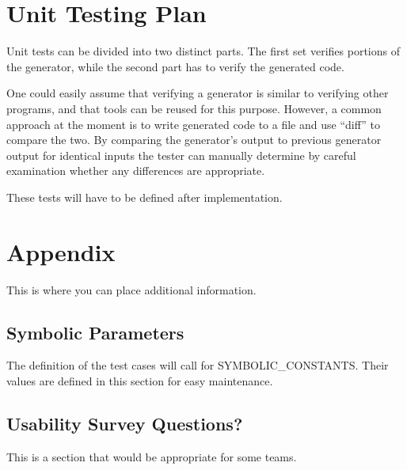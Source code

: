 \documentclass[12pt, titlepage]{article}
\begin{document}
				
\section{Unit Testing Plan}
		
Unit tests can be divided into two distinct parts. The first set verifies 
portions of the generator, while the second part has to verify the generated 
code.

One could easily assume that verifying a generator is similar to verifying 
other programs, and that tools can be reused for this purpose. However, a 
common approach at the moment is to write generated code to a file and use 
``diff'' to compare the two.
By comparing the generator's output to previous generator output for identical 
inputs the tester can manually determine by careful examination whether any 
differences are appropriate.

These tests will have to be defined after implementation.







\newpage

\section{Appendix}

This is where you can place additional information.

\subsection{Symbolic Parameters}

The definition of the test cases will call for SYMBOLIC\_CONSTANTS.
Their values are defined in this section for easy maintenance.

\subsection{Usability Survey Questions?}

This is a section that would be appropriate for some teams.
\end{document}
